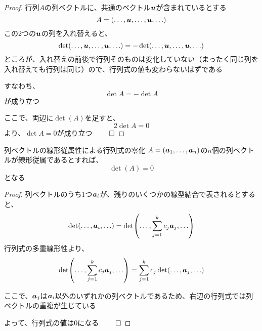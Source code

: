 \documentclass[../../../topic_linear-algebra]{subfiles}
\begin{document}
\begin{proof}
  行列$A$の列ベクトルに、共通のベクトル$\vb*{u}$が含まれているとする
  \begin{equation*}
    A = (\ldots, \vb*{u}, \ldots, \vb*{u}, \ldots)
  \end{equation*}
  この2つの$\vb*{u}$の列を入れ替えると、
  \begin{equation*}
    \det(\ldots, \vb*{u}, \ldots, \vb*{u}, \ldots) = -\det(\ldots, \vb*{u}, \ldots, \vb*{u}, \ldots)
  \end{equation*}
  ところが、入れ替えの前後で行列そのものは変化していない（まったく同じ列を入れ替えても行列は同じ）ので、行列式の値も変わらないはずである

  すなわち、
  \begin{equation*}
    \det A = -\det A
  \end{equation*}
  が成り立つ

  ここで、両辺に$\det(A)$を足すと、
  \begin{equation*}
    2\det A = 0
  \end{equation*}
  より、$\det A = 0$が成り立つ $\qed$
\end{proof}

\sectionline

\begin{theorem*}{列ベクトルの線形従属性による行列式の零化}
  $A = (\vb*{a}_1, \ldots, \vb*{a}_n)$の$n$個の列ベクトルが線形従属であるとすれば、
  \begin{equation*}
    \det(A) = 0
  \end{equation*}
  となる
\end{theorem*}

\begin{proof}
  列ベクトルのうち1つ$\vb*{a}_i$が、残りのいくつかの線型結合で表されるとすると、
  \begin{equation*}
    \det(\ldots, \vb*{a}_i, \ldots) = \det(\ldots, \sum_{j=1}^{k} c_j \vb*{a}_{j}, \ldots)
  \end{equation*}
  行列式の多重線形性より、
  \begin{equation*}
    \det(\ldots, \sum_{j=1}^{k} c_j \vb*{a}_{j}, \ldots) = \sum_{j=1}^{k} c_j \det(\ldots, \vb*{a}_{j}, \ldots)
  \end{equation*}

  \br

  ここで、$\vb*{a}_j$は$\vb*{a}_i$以外のいずれかの列ベクトルであるため、右辺の行列式では列ベクトルの重複が生じている

  よって、行列式の値は0になる $\qed$
\end{proof}
\end{document}
